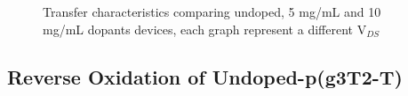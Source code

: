 \begin{figure}[!ht]
    \centering
    \caption[Transfer characteristics comparing different doping levels]{Transfer characteristics comparing undoped, 5 mg/mL and 10 mg/mL dopants devices, each graph represent a different V$_{DS }$}
    \label{fig:revox1}
\end{figure}


\subsection{Reverse Oxidation of Undoped-p(g3T2-T)}


